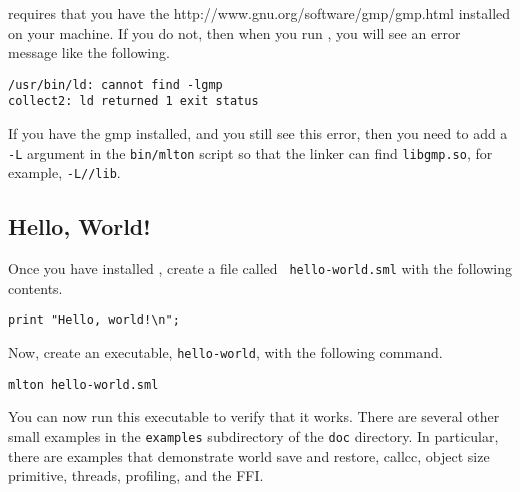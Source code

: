 {\mlton} requires that you have the
		  {http://www.gnu.org/software/gmp/gmp.html}
installed on your machine.  If you do not, then when you run {\mlton},
you will see an error message like the following.
\begin{verbatim}
/usr/bin/ld: cannot find -lgmp
collect2: ld returned 1 exit status
\end{verbatim}
If you have the gmp installed, and you still see this error, then you need to
add a {\tt -L} argument in the {\tt bin/mlton} script so that the linker can
find {\tt libgmp.so}, for example, {\tt -L/\prefix/lib}.

\subsection{Hello, World!}

Once you have installed {\mlton}, create a file called {\tt
hello-world.sml} with the following contents.

\begin{verbatim}
print "Hello, world!\n";
\end{verbatim}
Now, create an executable, {\tt hello-world}, with the following command.
\begin{verbatim}
mlton hello-world.sml
\end{verbatim}
You can now run this executable to verify that it works.  There are
several other small examples in the {\tt examples} subdirectory of the
{\tt doc} directory.  In particular, there are examples that
demonstrate world save and restore, callcc, object size primitive,
threads, profiling, and the FFI.
